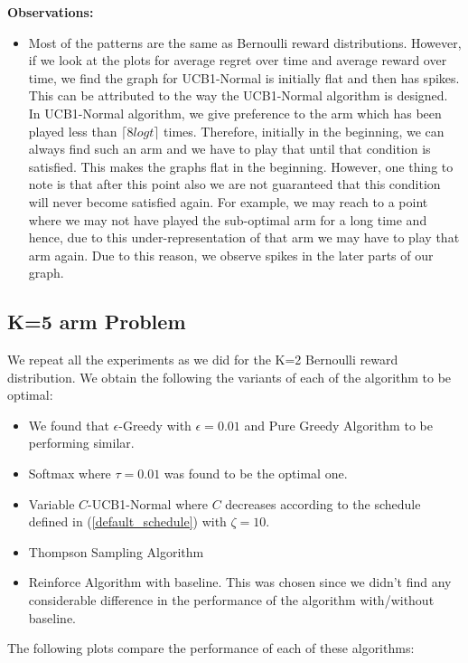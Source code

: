 \documentclass{article}
\begin{document}
		\textbf{Observations:}
		\begin{itemize}
			\item Most of the patterns are the same as Bernoulli reward distributions. However, if we look at the plots for average regret over time and average 
			reward over time, we find the graph for UCB1-Normal is initially flat and then has spikes. This can be attributed to the way the UCB1-Normal
			algorithm is designed. In UCB1-Normal algorithm, we give preference to the arm which has been played less than $\lceil 8 log t \rceil$ times. Therefore,
			initially in the beginning, we can always find such an arm and we have to play that until that condition is satisfied. This makes the graphs flat in 
			the beginning. However, one thing to note is that after this point also we are not guaranteed that this condition will never become satisfied again. For
			example, we may reach to a point where we may not have played the sub-optimal arm for a long time and hence, due to this under-representation of that arm
			we may have to play that arm again. Due to this reason, we observe spikes in the later parts of our graph.
		\end{itemize}
		
	\subsection{K=5 arm Problem}
		We repeat all the experiments as we did for the K=2 Bernoulli reward distribution. We obtain the following the variants of each of the algorithm to be optimal:
		\begin{itemize}
			\item We found that $\epsilon$-Greedy with $\epsilon=0.01$ and Pure Greedy Algorithm to be performing similar.
			\item Softmax where $\tau=0.01$ was found to be the optimal one.
			\item Variable $C$-UCB1-Normal where $C$ decreases according to the schedule defined in (\ref{default_schedule}) with $\zeta=10$.
			\item Thompson Sampling Algorithm
			\item Reinforce Algorithm with baseline. This was chosen since we didn't find any considerable difference in the performance of the algorithm with/without
				baseline.
		\end{itemize}
		
		The following plots compare the performance of each of these algorithms:
		
\end{document}
